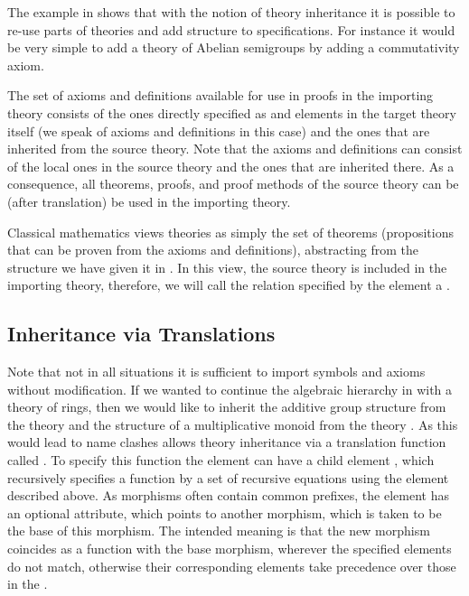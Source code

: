 The example in {} shows that with the notion of theory
inheritance it is possible to re-use parts of theories and add structure to
specifications. For instance it would be very simple to add a theory of Abelian
semigroups by adding a commutativity axiom.

The set of axioms and definitions available for use in proofs in the importing
theory consists of the ones directly specified as {} and
{} elements in the target theory itself (we speak of
{} axioms and definitions in this case) and the ones that are
inherited from the source theory.  Note that the {} axioms and
definitions can consist of the local ones in the source theory and the ones that
are inherited there. As a consequence, all theorems, proofs, and proof methods of
the source theory can be (after translation) be used in the importing theory. 

Classical mathematics views theories as simply the set of theorems (propositions
that can be proven from the axioms and definitions), abstracting from the
structure we have given it in {\omdoc}. In this view, the source theory is
included in the importing theory, therefore, we will call the relation specified
by the {} element a {}.

\subsection{Inheritance via Translations}\label{sec:morphisms} 

Note that not in all situations it is sufficient to import symbols and axioms
without modification. If we wanted to continue the algebraic hierarchy in
{} with a theory of rings, then we would like to inherit the
additive group structure from the theory {} and the structure of a
multiplicative monoid from the theory {}. As this would lead to name
clashes {\omdoc} allows theory inheritance via a translation function called
{}. To specify this function the {} element
can have a child element {}, which recursively specifies a
function by a set of recursive equations using the {} element
described above.  As morphisms often contain common prefixes, the
{} element has an optional {}
attribute, which points to another morphism, which is taken
to be the base of this morphism. The intended meaning is that the new morphism
coincides as a function with the base morphism, wherever the specified
{} elements do not match, otherwise their corresponding
{} elements take precedence over those in the {}.

